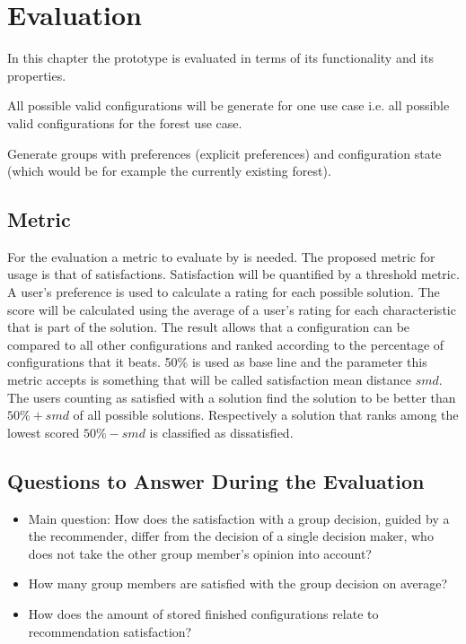 \chapter{Evaluation}
\label{ch:Evaluation}

In this chapter the prototype is evaluated in terms of its functionality and its properties.

All possible valid configurations will be generate for one use case i.e. all possible valid configurations for the forest use case.

Generate groups with preferences (explicit preferences) and configuration state (which would be for example the currently existing forest).

\section{Metric}
\label{sec:Evaluation:Metrics}

For the evaluation a metric to evaluate by is needed. The proposed metric for usage is that of satisfactions. Satisfaction will be quantified by a threshold metric. A user's preference is used to calculate a rating for each possible solution. The score will be calculated using the average of a user's rating for each characteristic that is part of the solution. The result allows that a configuration can be compared to all other configurations and ranked according to the percentage of configurations that it beats. 50\% is used as base line and the parameter this metric accepts is something that will be called satisfaction mean distance $smd$. The users counting as satisfied with a solution find the solution to be better than $50\% + smd$ of all possible solutions. Respectively a solution that ranks among the lowest scored $50\% - smd$ is classified as dissatisfied.

\section{Questions to Answer During the Evaluation}
\label{sec:Evaluation:Questions}

\begin{itemize}
    \item Main question: How does the satisfaction with a group decision, guided by a the recommender, differ from the decision of a single decision maker, who does not take the other group member's opinion into account?
    \item How many group members are satisfied with the group decision on average?
    \item How does the amount of stored finished configurations relate to recommendation satisfaction?
\end{itemize}

